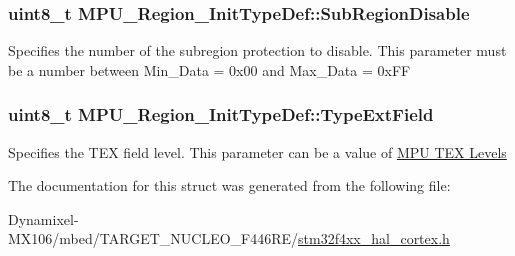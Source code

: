\subsubsection[{\texorpdfstring{Sub\+Region\+Disable}{SubRegionDisable}}]{\setlength{\rightskip}{0pt plus 5cm}uint8\+\_\+t M\+P\+U\+\_\+\+Region\+\_\+\+Init\+Type\+Def\+::\+Sub\+Region\+Disable}\hypertarget{struct_m_p_u___region___init_type_def_acd430a8bee6d8715fd6a06e96380f076}{}\label{struct_m_p_u___region___init_type_def_acd430a8bee6d8715fd6a06e96380f076}
Specifies the number of the subregion protection to disable. This parameter must be a number between Min\+\_\+\+Data = 0x00 and Max\+\_\+\+Data = 0x\+FF 
\subsubsection[{\texorpdfstring{Type\+Ext\+Field}{TypeExtField}}]{\setlength{\rightskip}{0pt plus 5cm}uint8\+\_\+t M\+P\+U\+\_\+\+Region\+\_\+\+Init\+Type\+Def\+::\+Type\+Ext\+Field}\hypertarget{struct_m_p_u___region___init_type_def_acb97237038b91760f8ecb48a21872030}{}\label{struct_m_p_u___region___init_type_def_acb97237038b91760f8ecb48a21872030}
Specifies the T\+EX field level. This parameter can be a value of \hyperlink{group___c_o_r_t_e_x___m_p_u___t_e_x___levels}{M\+PU T\+EX Levels} 

The documentation for this struct was generated from the following file\+:\begin{DoxyCompactItemize}
\item 
Dynamixel-\/\+M\+X106/mbed/\+T\+A\+R\+G\+E\+T\+\_\+\+N\+U\+C\+L\+E\+O\+\_\+\+F446\+R\+E/\hyperlink{stm32f4xx__hal__cortex_8h}{stm32f4xx\+\_\+hal\+\_\+cortex.\+h}\end{DoxyCompactItemize}
